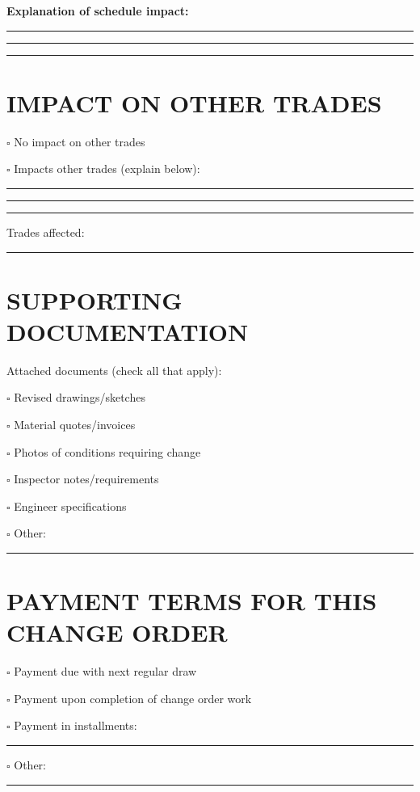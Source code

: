 \documentclass[11pt,letterpaper]{article}
\begin{document}
\textbf{Explanation of schedule impact:}

\rule{14cm}{0.4pt}

\rule{14cm}{0.4pt}

\rule{14cm}{0.4pt}

\vspace{6pt}

\section*{IMPACT ON OTHER TRADES}

$\square$ No impact on other trades

$\square$ Impacts other trades (explain below):

\rule{14cm}{0.4pt}

\rule{14cm}{0.4pt}

\rule{14cm}{0.4pt}

Trades affected: \rule{10cm}{0.4pt}

\vspace{6pt}

\section*{SUPPORTING DOCUMENTATION}

Attached documents (check all that apply):

$\square$ Revised drawings/sketches

$\square$ Material quotes/invoices

$\square$ Photos of conditions requiring change

$\square$ Inspector notes/requirements

$\square$ Engineer specifications

$\square$ Other: \rule{8cm}{0.4pt}

\vspace{6pt}

\section*{PAYMENT TERMS FOR THIS CHANGE ORDER}

$\square$ Payment due with next regular draw

$\square$ Payment upon completion of change order work

$\square$ Payment in installments: \rule{7cm}{0.4pt}

$\square$ Other: \rule{9cm}{0.4pt}

\vspace{12pt}
\end{document}
